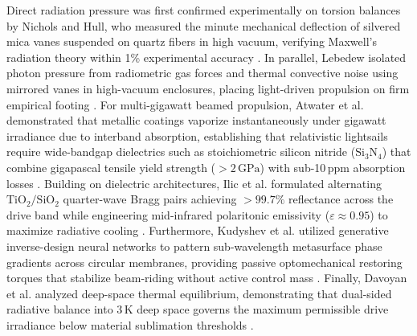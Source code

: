 \documentclass[aps,prd,reprint,superscriptaddress,nofootinbib,floatfix]{revtex4-2}
\begin{document}
Direct radiation pressure was first confirmed experimentally on torsion balances by Nichols and Hull, who measured the minute mechanical deflection of silvered mica vanes suspended on quartz fibers in high vacuum, verifying Maxwell's radiation theory within 1\% experimental accuracy \cite{ref10}. In parallel, Lebedew isolated photon pressure from radiometric gas forces and thermal convective noise using mirrored vanes in high-vacuum enclosures, placing light-driven propulsion on firm empirical footing \cite{ref11}. For multi-gigawatt beamed propulsion, Atwater et al. demonstrated that metallic coatings vaporize instantaneously under gigawatt irradiance due to interband absorption, establishing that relativistic lightsails require wide-bandgap dielectrics such as stoichiometric silicon nitride ($\mathrm{Si}_3\mathrm{N}_4$) that combine gigapascal tensile yield strength ($>2\,\mathrm{GPa}$) with sub-10\,ppm absorption losses \cite{ref12}. Building on dielectric architectures, Ilic et al. formulated alternating $\mathrm{TiO}_2/\mathrm{SiO}_2$ quarter-wave Bragg pairs achieving $>99.7\%$ reflectance across the drive band while engineering mid-infrared polaritonic emissivity ($\varepsilon \approx 0.95$) to maximize radiative cooling \cite{ref13}. Furthermore, Kudyshev et al. utilized generative inverse-design neural networks to pattern sub-wavelength metasurface phase gradients across circular membranes, providing passive optomechanical restoring torques that stabilize beam-riding without active control mass \cite{ref14}. Finally, Davoyan et al. analyzed deep-space thermal equilibrium, demonstrating that dual-sided radiative balance into $3\,\mathrm{K}$ deep space governs the maximum permissible drive irradiance below material sublimation thresholds \cite{ref15}.
\end{document}
